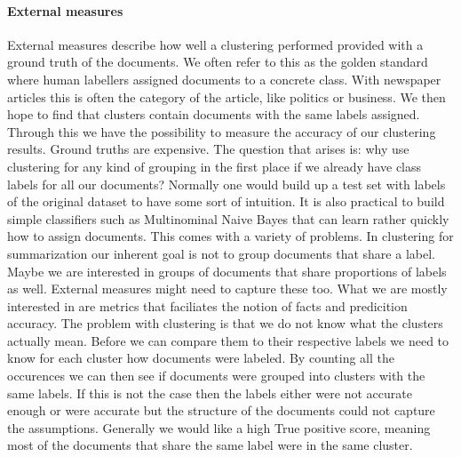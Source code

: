     \paragraph{External measures}
      External measures describe how well a clustering performed provided with a ground truth of the documents. We often refer to this as the golden standard where human labellers assigned documents to a concrete class. With newspaper articles this is often the category of the article, like politics or business. We then hope to find that clusters contain documents with the same labels assigned. Through this we have the possibility to measure the accuracy of our clustering results. Ground truths are expensive. The question that arises is: why use clustering for any kind of grouping in the first place if we already have class labels for all our documents? Normally one would build up a test set with labels of the original dataset to have some sort of intuition. It is also practical to build simple classifiers such as Multinominal Naive Bayes that can learn rather quickly how to assign documents. This comes with a variety of problems. In clustering for summarization our inherent goal is not to group documents that share a label. Maybe we are interested in groups of documents that share proportions of labels as well. External measures might need to capture these too.
      What we are mostly interested in are metrics that faciliates the notion of facts and predicition accuracy. The problem with clustering is that we do not know what the clusters actually mean. Before we can compare them to their respective labels we need to know for each cluster how documents were labeled. By counting all the occurences we can then see if documents were grouped into clusters with the same labels. If this is not the case then the labels either were not accurate enough or were accurate but the structure of the documents could not capture the assumptions. Generally we would like a high True positive score, meaning most of the documents that share the same label were in the same cluster.

